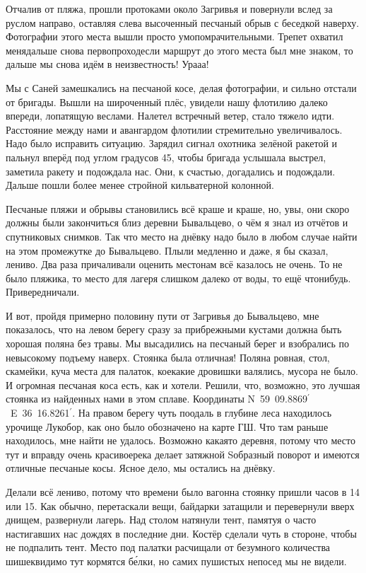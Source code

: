 Отчалив от пляжа, прошли протоками около Загривья и повернули вслед за руслом направо, оставляя слева высоченный песчаный обрыв с беседкой наверху. Фотографии этого места вышли просто умопомрачительными. Трепет охватил меня\mdash дальше снова первопроход\mdash если маршрут до этого места был мне знаком, то дальше мы снова идём в неизвестность! Ура\sdash а\sdash а!

Мы с Саней замешкались на песчаной косе, делая фотографии, и сильно отстали от бригады. Вышли на широченный плёс, увидели нашу флотилию далеко впереди, лопатящую веслами. Налетел встречный ветер, стало тяжело идти. Расстояние между нами и авангардом флотилии стремительно увеличивалось. Надо было исправить ситуацию. Зарядил сигнал охотника зелёной ракетой и пальнул вперёд под углом градусов 45, чтобы бригада услышала выстрел, заметила ракету и подождала нас. Они, к счастью, догадались и подождали. Дальше пошли более менее стройной кильватерной колонной.

Песчаные пляжи и обрывы становились всё краше и краше, но, увы, они скоро должны были закончиться близ деревни Бывальцево, о чём я знал из отчётов и спутниковых снимков. Так что место на днёвку надо было в любом случае найти на этом промежутке до Бывальцево. Плыли медленно и даже, я бы сказал, лениво. Два раза причаливали оценить место\mdash нам всё казалось не очень. То не было пляжика, то место для лагеря слишком далеко от воды, то ещё что\sdash нибудь. Привередничали.

И вот, пройдя примерно половину пути от Загривья до Бывальцево, мне показалось, что на левом берегу сразу за прибрежными кустами должна быть хорошая поляна без травы. Мы высадились на песчаный берег и взобрались по невысокому подъему наверх. Стоянка была отличная! Поляна ровная, стол, скамейки, куча места для палаток, кое\sdash какие дровишки валялись, мусора не было. И огромная песчаная коса есть, как и хотели. Решили, что, возможно, это лучшая стоянка из найденных нами в этом сплаве. Координаты N~59\degree~09.8869$^\prime$~E~36\degree~16.8261$^\prime$. На правом берегу чуть поодаль в глубине леса находилось урочище Лукобор, как оно было обозначено на карте ГШ. Что там раньше находилось, мне найти не удалось. Возможно какая\sdash то деревня, потому что место тут и вправду очень красивое\mdash река делает затяжной S\sdash образный поворот и имеются отличные песчаные косы.  Ясное дело, мы остались на днёвку.

Делали всё лениво, потому что времени было вагон\mdash на стоянку пришли часов в 14 или 15. Как обычно, перетаскали вещи, байдарки затащили и перевернули вверх днищем, развернули лагерь. Над столом натянули тент, памятуя о часто настигавших нас дождях в последние дни. Костёр сделали чуть в стороне, чтобы не подпалить тент. Место под палатки расчищали от безумного количества шишек\mdash видимо тут кормятся б\'{е}лки, но самих пушистых непосед мы не видели. 

